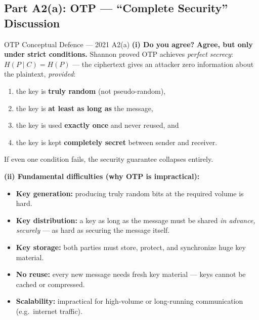 \documentclass[12pt,a4paper]{article}
\begin{document}
\subsection{Part A2(a): OTP --- ``Complete Security'' Discussion}
\begin{solbox}{OTP Conceptual Defence --- 2021 A2(a)}
\textbf{(i) Do you agree?} \textbf{Agree, but only under strict conditions.} Shannon proved OTP achieves \emph{perfect secrecy}: $H(P\mid C)=H(P)$ --- the ciphertext gives an attacker zero information about the plaintext, \emph{provided}:
\begin{enumerate}[noitemsep]
  \item the key is \textbf{truly random} (not pseudo-random),
  \item the key is \textbf{at least as long as} the message,
  \item the key is used \textbf{exactly once} and never reused, and
  \item the key is kept \textbf{completely secret} between sender and receiver.
\end{enumerate}
If even one condition fails, the security guarantee collapses entirely.

\textbf{(ii) Fundamental difficulties (why OTP is impractical):}
\begin{itemize}[noitemsep]
  \item \textbf{Key generation:} producing truly random bits at the required volume is hard.
  \item \textbf{Key distribution:} a key as long as the message must be shared \emph{in advance, securely} --- as hard as securing the message itself.
  \item \textbf{Key storage:} both parties must store, protect, and synchronize huge key material.
  \item \textbf{No reuse:} every new message needs fresh key material --- keys cannot be cached or compressed.
  \item \textbf{Scalability:} impractical for high-volume or long-running communication (e.g.\ internet traffic).
\end{itemize}
\end{solbox}
\end{document}
